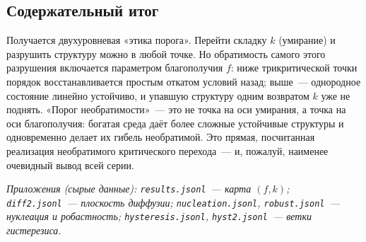 \documentclass[11pt]{article}
\newcommand{\hruleline}{\vspace{-2pt}{\color{acrule}\hrule height 0.6pt}\vspace{6pt}}
\begin{document}
\subsection{Содержательный итог}
Получается двухуровневая «этика порога». Перейти складку $k$ (умирание) и разрушить структуру можно в
любой точке. Но обратимость самого этого разрушения включается параметром благополучия $f$: ниже
трикритической точки порядок восстанавливается простым откатом условий назад; выше~— однородное
состояние линейно устойчиво, и упавшую структуру одним возвратом $k$ уже не поднять. «Порог
необратимости»~— это не точка на оси умирания, а точка на оси благополучия: богатая среда даёт более
сложные устойчивые структуры и одновременно делает их гибель необратимой. Это прямая, посчитанная
реализация необратимого критического перехода~— и, пожалуй, наименее очевидный вывод всей серии.

\vspace{6mm}\hruleline
{\small\itshape\color{acgrey}
Приложения (сырые данные): \texttt{results.jsonl}~— карта $(f,k)$; \texttt{diff2.jsonl}~— плоскость
диффузии; \texttt{nucleation.jsonl}, \texttt{robust.jsonl}~— нуклеация и робастность;
\texttt{hysteresis.jsonl}, \texttt{hyst2.jsonl}~— ветки гистерезиса.}
\end{document}
